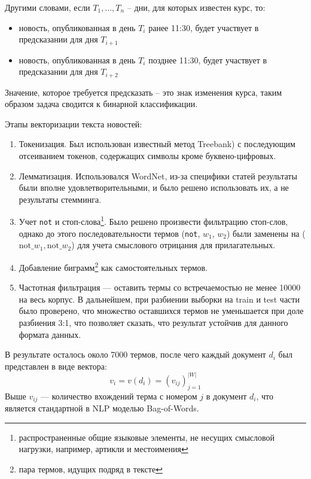 \documentclass[pdftex,ptm,14pt,a4paper]{report}
\begin{document}
Другими словами, если $T_1,\ldots , T_n$ -- дни, для которых известен курс, то:
\begin{itemize}
\item новость, опубликованная в день $T_i$ ранее 11:30, будет участвует в предсказании для дня $T_{i+1}$
\item новость, опубликованная в день $T_i$ позднее 11:30, будет участвует в предсказании для дня $T_{i+2}$
\end{itemize}

Значение, которое требуется предсказать -- это знак изменения курса, таким образом задача сводится к бинарной классификации.

Этапы векторизации текста новостей:

\begin{enumerate}

\item Токенизация. Был использован известный метод Treebank\cite{treebank}) с последующим отсеиванием токенов,
содержащих символы кроме буквено-цифровых.
\item Лемматизация. Использовался WordNet\cite{wordnet}, из-за специфики статей результаты были вполне удовлетворительными,
и было решено использовать их, а не результаты стемминга.
\item Учет \texttt{not} и стоп-слова\footnote{распространенные общие языковые элементы, не несущих смысловой нагрузки,
например, артикли и местоимения}. Было решено произвести фильтрацию стоп-слов, однако до этого последовательности
термов (\texttt{not}, $w_1$, $w_2$) были заменены на ($\text{not\_} w_1, \text{not\_} w_2$) для учета смыслового отрицания
для прилагательных.
\item Добавление биграмм\footnote{пара термов, идущих подряд в тексте} как самостоятельных термов.
\item Частотная фильтрация --- оставить термы со встречаемостью не менее 10000 на весь корпус. В дальнейшем, при разбиении
выборки на train и test части было проверено, что множество оставшихся термов не уменьшается при доле
разбиения 3:1, что позволяет сказать, что результат устойчив для данного формата данных.

\end{enumerate}

В результате осталось около 7000 термов, после чего каждый документ $d_i$ был представлен в виде вектора:
\begin{equation}
v_i = v(d_i) = (v_{ij})_{j=1}^{|W|}
\end{equation}
Выше $v_{ij}$ --- количество вхождений терма с номером $j$ в документ $d_i$, что является стандартной в NLP
моделью Bag-of-Words.
\end{document}
